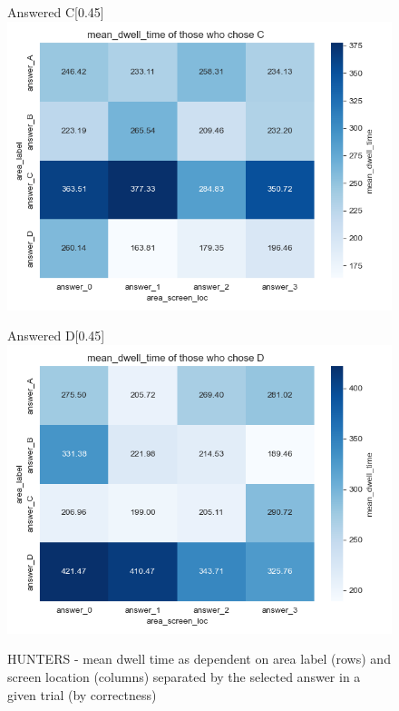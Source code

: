 \documentclass{article}
\begin{document}
\begin{figure}[H]
          \vspace{1em} 
        
          \begin{subcaptionbox}{Answered C\label{fig:C5}}[0.45\textwidth]
            {\centering\includegraphics[width=\linewidth]{plots/matrix_plots/matrix_mean_dwell_time_C_hunters.png}}
          \end{subcaptionbox}
          \hfill
          \begin{subcaptionbox}{Answered D\label{fig:D5}}[0.45\textwidth]
            {\centering\includegraphics[width=\linewidth]{plots/matrix_plots/matrix_mean_dwell_time_D_hunters.png}}
          \end{subcaptionbox}
          
          \caption{HUNTERS - mean dwell time as dependent on area label (rows) and screen location (columns) separated by the selected answer in a given trial (by correctness)}
          \label{fig:hun_dwell}
        \end{figure}
\end{document}

